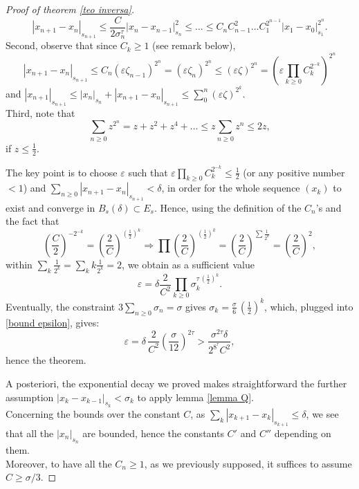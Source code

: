 \documentclass[oneside, 11pt]{amsbook}
\newcommand{\pa}[1]{{\left(#1\right)}}
\newcommand{\abs}[1]{{\left|#1\right|}}
\newcommand{\eps}{\varepsilon}
\newcommand{\0}{{(0)}}
\newcommand{\3}{{(3)}}
\numberwithin{equation}{section}
\numberwithin{defn}{section}
\numberwithin{prop}{section}
\numberwithin{cor}{section}
\numberwithin{lemma}{section}
\numberwithin{rmk}{section}
\numberwithin{corollary}{section}
\begin{document}
\begin{proof}[Proof of theorem \ref{teo inversa}]
\begin{equation*}
\abs{x_{n+1} - x_n}_{s_{n+1}}\leq \frac{C}{2\sigma_n^{\tau}}\abs{x_n - x_{n-1}}^2_{s_{n}} \leq \ldots \leq C_n C_{n-1}^2\ldots C_1^{2^{n-1}}\abs{x_1 - x_0}^{2^n}_{s_1}.
\end{equation*}
Second, observe that since $C_k\geq 1$ (see remark below), $$\abs{x_{n+1}-x_n}_{s_{n+1}}\leq C_n( \eps \zeta_{n-1})^{2^n} = (\eps\zeta_n)^{2^n} \leq (\eps\zeta)^{2^n} =\pa{\eps\prod_{k\geq 0}C_k^{2^{-k}}}^{2^n}$$ and $\abs{x_{n+1}}_{s_{n+1}} \leq \abs{x_n}_{s_n} + \abs{x_{n+1} - x_n}_{s_{n+1}} \leq  \sum_{0}^n (\eps\zeta)^{2^k}$.\\
Third, note that $$ \sum_{n\geq 0} z^{2^n} = z + z^2 + z^4 + \ldots \leq z\sum_{n\geq 0} z^n \leq 2z, $$ if $z\leq\frac{1}{2}$.

The key point is to choose $\eps$ such that $\eps \prod_{k\geq 0}C_k^{2^{-k}}\leq \frac{1}{2}$ (or any positive number $< 1$)  and $\sum_{n\geq 0}\abs{x_{n+1} - x_n}_{s_{n+1}}<\delta$, in order for the whole sequence $(x_k)$ to exist and converge in $B_s(\delta)\subset E_s$. Hence, using the definition of the $C_n$'s and the fact that $$\pa{\frac{C}{2}}^{-2^{-k}}=\pa{\frac{2}{C}}^{\pa{\frac{1}{2}}^k}\Longrightarrow\prod  \pa{\frac{2}{C}}^{\pa{\frac{1}{2}}^k} = \pa{\frac{2}{C}}^{\sum\frac{1}{2^k}}=\pa{\frac{2}{C}}^2,$$ within $\sum_k \frac{1}{2^k} = \sum_k k\frac{1}{2^{k}}=2$, we obtain as a sufficient value
\begin{equation}
\eps = \delta \frac{2}{C^2}\prod_{k\geq 0}\sigma_k^{\tau\,(\frac{1}{2})^k}.
\label{bound epsilon}
\end{equation}
Eventually, the constraint $3\sum_{n\geq 0}\sigma_n = \sigma$ gives $\sigma_k= \frac{\sigma}{6}\,\pa{\frac{1}{2}}^k$, which, plugged into \eqref{bound epsilon}, gives: 
\[\eps = \delta \, \frac{2}{C^2}\pa{\frac{\sigma}{12}}^{2\tau} > \frac{\sigma^{2\tau}\delta}{2^{8^{\tau}}C^2},\]
hence the theorem. 

A posteriori, the exponential decay we proved makes straightforward the further assumption $\abs{x_k - x_{k-1}}_{s_k}<\sigma_k$ to apply lemma \ref{lemma Q}.\\ Concerning the bounds over the constant $C$, as $\sum_k \abs{x_{k+1} - x_k}_{s_{k+1}}\leq\delta$, we see that all the $\abs{x_n}_{s_n}$ are bounded, hence the constants $C'$ and $C''$ depending on them. \\Moreover, to have all the $C_n\geq 1$, as we previously supposed, it suffices to assume $C\geq \sigma/3$.
\end{proof}
\end{document}
